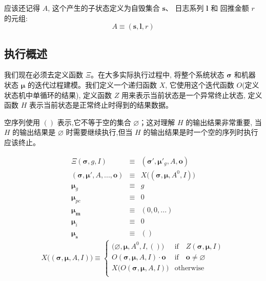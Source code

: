 \documentclass[9pt,oneside]{amsart}
\begin{document}
\begin{multicols}{2}
应该还记得 $A$, 这个产生的子状态定义为自毁集合 $\mathbf{s}$、 日志系列 $\mathbf{l}$ 和 回推金额 $r$ 的元组:
\begin{equation}
A \equiv (\mathbf{s}, \mathbf{l}, r)
\end{equation}

\subsection{执行概述}

我们现在必须去定义函数 $\Xi$。在大多实际执行过程中, 将整个系统状态 $\boldsymbol{\sigma}$ 和机器状态 $\boldsymbol{\mu}$ 的迭代过程建模。我们定义一个递归函数 $X$, 它使用这个迭代函数 $O$(定义状态机中单循环的结果), 定义函数 $Z$ 用来表示当前状态是一个异常终止状态, 定义函数 $H$ 表示当前状态是正常终止时得到的结果数据。

空序列使用 $()$ 表示,它不等于空的集合 $\varnothing$；这对理解 $H$ 的输出结果非常重要, 当 $H$ 的输出结果是 $\varnothing$ 时需要继续执行,但当 $H$ 的输出结果是时一个空的序列时执行应该终止。

\begin{eqnarray}
\Xi(\boldsymbol{\sigma}, g, I) & \equiv & (\boldsymbol{\sigma}'\!, \boldsymbol{\mu}'_g, A, \mathbf{o}) \\
(\boldsymbol{\sigma}, \boldsymbol{\mu}'\!, A, ..., \mathbf{o}) & \equiv & X\big((\boldsymbol{\sigma}, \boldsymbol{\mu}, A^0\!, I)\big) \\
\boldsymbol{\mu}_g & \equiv & g \\
\boldsymbol{\mu}_{pc} & \equiv & 0 \\
\boldsymbol{\mu}_\mathbf{m} & \equiv & (0, 0, ...) \\
\boldsymbol{\mu}_i & \equiv & 0 \\
\boldsymbol{\mu}_\mathbf{s} & \equiv & ()
\end{eqnarray}
\begin{equation}
X\big( (\boldsymbol{\sigma}, \boldsymbol{\mu}, A, I) \big) \equiv \begin{cases}
\big(\varnothing, \boldsymbol{\mu}, A^0, I, ()\big) & \text{if} \quad Z(\boldsymbol{\sigma}, \boldsymbol{\mu}, I)\\
O(\boldsymbol{\sigma}, \boldsymbol{\mu}, A, I) \cdot \mathbf{o} & \text{if} \quad \mathbf{o} \neq \varnothing\\
X\big(O(\boldsymbol{\sigma}, \boldsymbol{\mu}, A, I)\big) & \text{otherwise}\\
\end{cases}
\end{equation}


\end{multicols}
\end{document}

